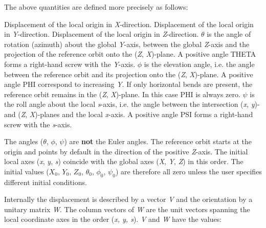 The above quantities are defined more precisely as follows:  
\begin{madlist}
    Displacement of the local origin in \textit{X}-direction. 
    Displacement of the local origin in \textit{Y}-direction. 
    Displacement of the local origin in \textit{Z}-direction. 
    $\theta$ is the angle of rotation (azimuth) about the
     global \textit{Y}-axis, between the global \textit{Z}-axis and the
     projection of the reference orbit onto the (\textit{Z},
     \textit{X})-plane. A positive angle THETA forms a right-hand screw
     with the \textit{Y}-axis. 
    $\phi$ is the elevation angle, i.e. the angle between the
     reference orbit and its projection onto the (\textit{Z},
     \textit{X})-plane. A positive angle PHI correspond to increasing
     \textit{Y}. If only horizontal bends are present, the reference
     orbit remains in the (\textit{Z}, \textit{X})-plane. In this case
     PHI is always zero. 
    $\psi$ is the roll angle about the local \textit{s}-axis,
     i.e. the angle between the intersection (\textit{x}, \textit{y})-
     and (\textit{Z}, \textit{X})-planes and the local
     \textit{x}-axis. A positive angle PSI forms a right-hand screw with
     the \textit{s}-axis. 
\end{madlist} 

The angles ($\theta$, $\phi$, $\psi$) are \textbf{not} the Euler
angles. The reference orbit starts at the origin and points by default
in the direction of the positive \textit{Z}-axis. The initial local axes
(\textit{x}, \textit{y}, \textit{s})  coincide with the global axes
(\textit{X}, \textit{Y}, \textit{Z}) in this order. The initial values
($X_0$, $Y_0$, $Z_0$, $\theta_0$, $\phi_0$, $\psi_0$) are therefore all zero
unless the user specifies different initial conditions.  

Internally the displacement is described by a vector \textit{V} and the
orientation by a unitary matrix \textit{W}. The column vectors of
\textit{W} are the unit vectors spanning  the local coordinate axes in
the order (\textit{x, y, s}). \textit{V} and \textit{W} have the values:  

